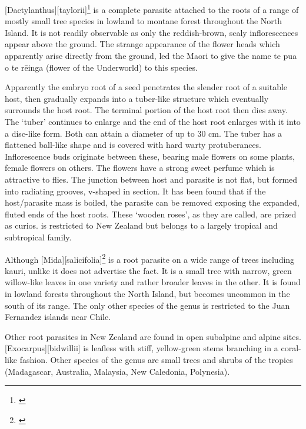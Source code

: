 [Dactylanthus][taylorii]\footnote{\cite{moore1940structure}} is a complete parasite attached to the roots of a range of mostly small tree species in lowland to montane forest throughout the North Island.
It is not readily observable as only the reddish-brown, scaly inflorescences appear above the ground.
The strange appearance of the flower heads which apparently arise directly from the ground, led the Maori to give the name te pua o te rēinga (flower of the Underworld) to this species.

Apparently the embryo root of a  seed penetrates the slender root of a suitable host, then gradually expands into a tuber-like structure which eventually surrounds the host root.
The terminal portion of the host root then dies away.
The `tuber' continues to enlarge and the end of the host root enlarges with it into a disc-like form.
Both can attain a diameter of up to 30 cm.
The tuber has a flattened ball-like shape and is covered with hard warty protuberances.
Inflorescence buds originate between these, bearing male flowers on some plants, female flowers on others.
The flowers have a strong sweet perfume which is attractive to flies.
The junction between host and parasite is not flat, but formed into radiating grooves, v-shaped in section.
It has been found that if the host/parasite mass is boiled, the parasite can be removed exposing the expanded, fluted ends of the host roots.
These `wooden roses', as they are called, are prized as curios.  is restricted to New Zealand but belongs to a largely tropical and subtropical family.

Although [Mida][salicifolia]\footnote{\cite{philipson1959some}} is a root parasite on a wide range of trees including kauri, unlike  it does not advertise the fact.
It is a small tree with narrow, green willow-like leaves in one variety and rather broader leaves in the other.
It is found in lowland forests throughout the North Island, but becomes uncommon in the south of its range.
The only other species of the genus is restricted to the Juan Fernandez islands near Chile.

Other root parasites in New Zealand are found in open subalpine and alpine sites. [Exocarpus][bidwillii] is leafless with stiff, yellow-green stems branching in a coral-like fashion.
Other species of the genus are small trees and shrubs of the tropics (Madagascar, Australia, Malaysia, New Caledonia, Polynesia).

